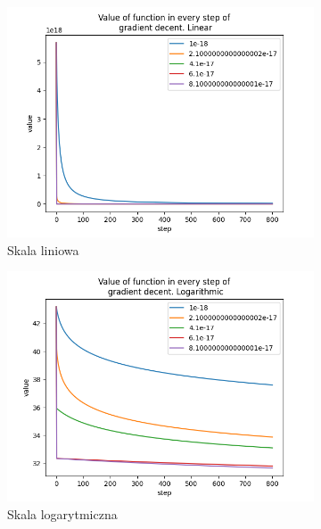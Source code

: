 \begin{figure}[h!]
\begin{subfigure}[b]{0.3\linewidth}
		\includegraphics[width=\linewidth]{photos/f2_vals_lin.png}
		\caption{Skala liniowa}
	\end{subfigure}
	\begin{subfigure}[b]{0.3\linewidth}
		\includegraphics[width=\linewidth]{photos/f2_vals_log.png}
		\caption{Skala logarytmiczna}
	\end{subfigure}
	\caption{Charakterystyka wartości funkcji CEC2017 f2 od kroku w zależności od wartości $\beta$.}
	\begin{subfigure}[b]{0.3\linewidth}

\end{subfigure}
\end{figure}
